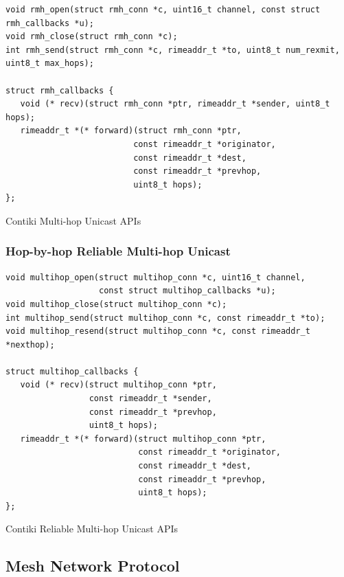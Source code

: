 \begin{listing}[H]
\begin{verbatim}
void rmh_open(struct rmh_conn *c, uint16_t channel, const struct rmh_callbacks *u);
void rmh_close(struct rmh_conn *c);
int rmh_send(struct rmh_conn *c, rimeaddr_t *to, uint8_t num_rexmit, uint8_t max_hops);

struct rmh_callbacks {
   void (* recv)(struct rmh_conn *ptr, rimeaddr_t *sender, uint8_t hops);
   rimeaddr_t *(* forward)(struct rmh_conn *ptr,
                          const rimeaddr_t *originator,
                          const rimeaddr_t *dest,
                          const rimeaddr_t *prevhop,
                          uint8_t hops);
};
\end{verbatim}
\caption{Contiki Multi-hop Unicast APIs}
\end{listing}

\subsubsection{Hop-by-hop Reliable Multi-hop Unicast}

\begin{listing}[H]
\begin{verbatim}
void multihop_open(struct multihop_conn *c, uint16_t channel,
                   const struct multihop_callbacks *u);
void multihop_close(struct multihop_conn *c);
int multihop_send(struct multihop_conn *c, const rimeaddr_t *to);
void multihop_resend(struct multihop_conn *c, const rimeaddr_t *nexthop);

struct multihop_callbacks {
   void (* recv)(struct multihop_conn *ptr,
                 const rimeaddr_t *sender,
                 const rimeaddr_t *prevhop,
                 uint8_t hops);
   rimeaddr_t *(* forward)(struct multihop_conn *ptr,
                           const rimeaddr_t *originator,
                           const rimeaddr_t *dest,
                           const rimeaddr_t *prevhop,
                           uint8_t hops);
};
\end{verbatim}
\caption{Contiki Reliable Multi-hop Unicast APIs}
\end{listing}


\subsection{Mesh Network Protocol}

